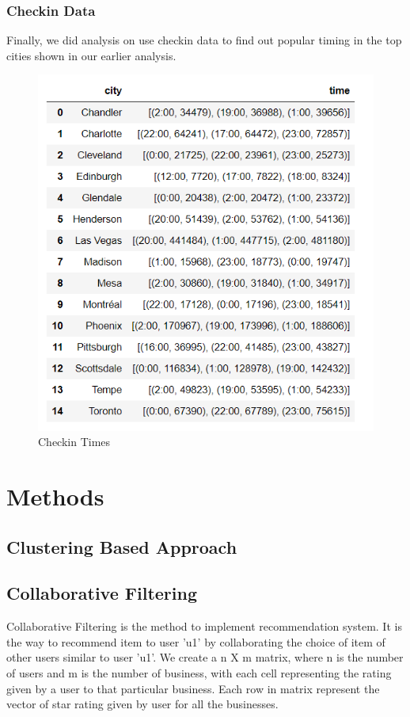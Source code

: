 \documentclass[11pt]{article}
\begin{document}
 	\subsubsection{Checkin Data}
 	Finally, we did analysis on use checkin data to find out popular timing in the top cities shown in our earlier analysis.
 
      \begin{figure}[h]
 		\centering
 		\includegraphics[scale=0.5] {checkin_times.png}
 		\caption{Checkin Times}
 	\end{figure}
 	
	\section{Methods}
		
		\subsection{Clustering Based Approach}
		
		\subsection{Collaborative Filtering}
		Collaborative Filtering is the method to implement recommendation system. It is the way to recommend item to user 'u1' by collaborating the choice of item of other users similar to user 'u1'. We create a n X m matrix, where n is the number of users and m is the number of business, with each cell representing the rating given by a user to that particular business. Each row in matrix represent the vector of star rating given by user for all the businesses. \\
	 
\end{document}
